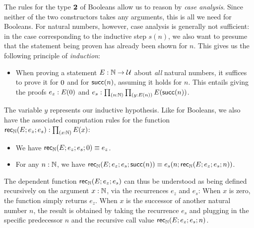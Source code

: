 The rules for the type ${\mathbf{2}}$ of Booleans allow us to reason by \emph{case analysis}. Since neither of the two constructors takes any arguments, this is all we need for Booleans. For natural numbers, however, case analysis is generally not sufficient: in the case corresponding to the inductive step $s(n)$, we also want to presume that the statement being proven has already been shown for $n$. This gives us the following principle of \emph{induction}: 
\begin{itemize}
\item When proving a statement $E : \mathbb{N} \to \mathcal{U}$ about \emph{all} natural numbers, it suffices to prove it for $0$ and for $\mathsf{succ}(n)$, assuming it holds
for $n$. This entails giving the proofs $e_z : E(0)$ and $e_s : \prd{n : \nat}{y : E(n)} E(\s(n))$.
\end{itemize}
The variable $y$ represents our inductive hypothesis. Like for Booleans, we also have the associated computation rules for the function $\rec\nat(E;e_z;e_s) : \prd{x:\nat} E(x)$:
\begin{itemize}
\item We have $\mathsf{rec}_{\mathbb{N}}(E;e_z;e_s;0) \equiv e_z$.
\item For any $n : \mathbb{N}$, we have $\mathsf{rec}_{\mathbb{N}}(E;e_z;e_s;\mathsf{succ}(n)) \equiv e_s(n;\mathsf{rec}_{\mathbb{N}}(E;e_z;e_s;n))$.
\end{itemize}
The dependent function $\mathsf{rec}_{\mathbb{N}}(E;e_z;e_s)$ can thus be understood as being defined recursively on the argument $x : \mathbb{N}$, via the recurrences $e_z$ and $e_s$: When $x$ is zero, the function simply returns $e_z$. When $x$ is the successor of another natural number $n$, the result is obtained by taking the recurrence $e_s$ and plugging in the specific predecessor $n$ and the recursive call value $\mathsf{rec}_{\mathbb{N}}(E;e_z;e_s;n)$.

